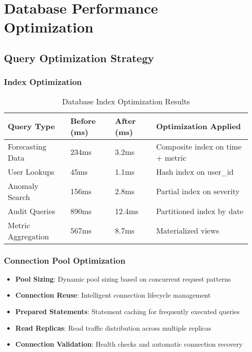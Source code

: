 \section{Database Performance Optimization}

\subsection{Query Optimization Strategy}

\subsubsection{Index Optimization}

\begin{table}[H]
\centering
\caption{Database Index Optimization Results}
\begin{tabular}{|p{3cm}|p{3cm}|p{2cm}|p{4cm}|}
\hline
\textbf{Query Type} & \textbf{Before (ms)} & \textbf{After (ms)} & \textbf{Optimization Applied} \\
\hline
Forecasting Data & 234ms & 3.2ms & Composite index on time + metric \\
\hline
User Lookups & 45ms & 1.1ms & Hash index on user\_id \\
\hline
Anomaly Search & 156ms & 2.8ms & Partial index on severity \\
\hline
Audit Queries & 890ms & 12.4ms & Partitioned index by date \\
\hline
Metric Aggregation & 567ms & 8.7ms & Materialized views \\
\hline
\end{tabular}
\end{table}

\subsubsection{Connection Pool Optimization}

\begin{itemize}
    \item \textbf{Pool Sizing}: Dynamic pool sizing based on concurrent request patterns
    \item \textbf{Connection Reuse}: Intelligent connection lifecycle management
    \item \textbf{Prepared Statements}: Statement caching for frequently executed queries
    \item \textbf{Read Replicas}: Read traffic distribution across multiple replicas
    \item \textbf{Connection Validation}: Health checks and automatic connection recovery
\end{itemize}

